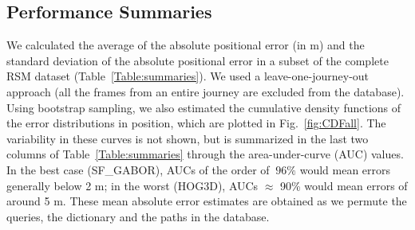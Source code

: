 \subsection{Performance Summaries}
\label{visloc_perf}
We calculated the average of the absolute positional error (in m) and the standard deviation of the absolute positional error in a subset of the complete RSM dataset (Table~\ref{Table:summaries}). We  used a leave-one-journey-out approach (all the frames from an entire journey are excluded from the database).  Using bootstrap sampling, we also estimated the cumulative density functions of the error distributions in position, which are plotted in Fig.~\ref{fig:CDFall}. The variability in these curves is not shown, but is summarized in the last two columns of Table~\ref{Table:summaries} through the area-under-curve (AUC) values. In the best case (SF\_GABOR), AUCs of the order of $~96\%$ would mean errors generally below 2 m; in the worst (HOG3D), AUCs $\approx$ 90\% would mean errors of around 5 m.  These  mean absolute error estimates are obtained as we permute the queries, the dictionary and the paths in the database. 


